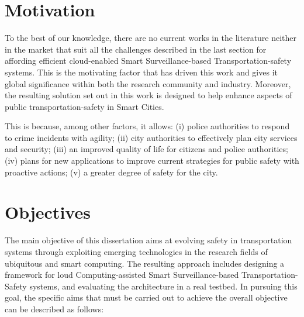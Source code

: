 \section{Motivation}

To the best of our knowledge, there are no current works in the literature neither in the market that suit all the challenges described in the last section for affording efficient cloud-enabled Smart Surveillance-based Transportation-safety systems. This is the motivating factor that has driven this work and gives it global significance within both the research community and industry. Moreover, the resulting solution set out in this work is designed to help enhance aspects of public transportation-safety in Smart Cities. 

This is because, among other factors, it allows: (i) police authorities to respond to crime incidents with agility; (ii) city authorities to effectively plan city services and security; (iii) an improved quality of life for citizens and police authorities; (iv) plans for new applications to improve current strategies for public safety with proactive actions; (v) a greater degree of safety for the city.

\section{Objectives}

The main objective of this dissertation aims at evolving safety in transportation systems through exploiting emerging technologies in the research fields of ubiquitous and smart computing. The resulting approach includes designing a framework for loud Computing-assisted Smart Surveillance-based Transportation-Safety systems, and evaluating the architecture in a real testbed. In pursuing this goal, the specific aims that must be carried out to achieve the overall objective can be described as follows:

